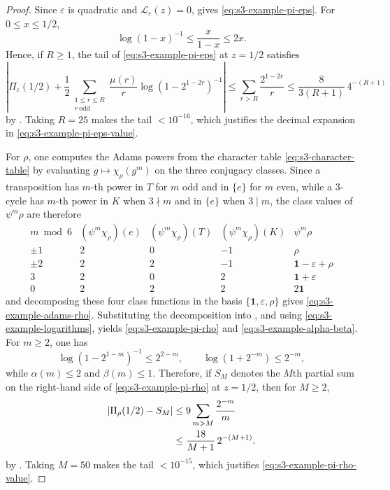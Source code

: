 \begin{proof}
  Since \(\varepsilon\) is quadratic and
  \(\mathcal L_\varepsilon(z)=0\), 
  gives \eqref{eq:s3-example-pi-eps}. For \(0\le x\le 1/2\),
  \[
    \log(1-x)^{-1}\le \frac{x}{1-x}\le 2x.
  \]
  Hence, if \(R\ge 1\), the tail of \eqref{eq:s3-example-pi-eps} at
  \(z=1/2\) satisfies
  \[
    \left|
      \Pi_\varepsilon(1/2)
      +\frac12\sum_{\substack{1\le r\le R\\ r\ \mathrm{odd}}}
        \frac{\mu(r)}{r}\log(1-2^{1-2r})^{-1}
    \right|
    \le
    \sum_{r>R}\frac{2^{1-2r}}{r}
    \le
    \frac{8}{3(R+1)}\,4^{-(R+1)}
  \]
  by . Taking \(R=25\) makes the tail
  \(<10^{-16}\), which justifies the decimal expansion in
  \eqref{eq:s3-example-pi-eps-value}.

  For \(\rho\), one computes the Adams powers from the character table
  \eqref{eq:s3-character-table} by evaluating
  \(g\mapsto \chi_\rho(g^m)\) on the three conjugacy classes. Since a
  transposition has \(m\)-th power in \(T\) for \(m\) odd and in
  \(\{e\}\) for \(m\) even, while a \(3\)-cycle has \(m\)-th power in
  \(K\) when \(3\nmid m\) and in \(\{e\}\) when \(3\mid m\), the class
  values of \(\psi^m\rho\) are therefore
  \[
    \begin{array}{c|ccc|c}
      m \bmod 6
      & (\psi^m\chi_\rho)(e)
      & (\psi^m\chi_\rho)(T)
      & (\psi^m\chi_\rho)(K)
      & \psi^m\rho \\ \hline
      \pm 1 & 2 & 0 & -1 & \rho \\
      \pm 2 & 2 & 2 & -1 & \mathbf 1-\varepsilon+\rho \\
      3 & 2 & 0 & 2 & \mathbf 1+\varepsilon \\
      0 & 2 & 2 & 2 & 2\mathbf 1
    \end{array}
  \]
  and decomposing these four class functions in the basis
  \(\{\mathbf 1,\varepsilon,\rho\}\) gives
  \eqref{eq:s3-example-adams-rho}. Substituting the decomposition into
  , and using
  \eqref{eq:s3-example-logarithms}, yields
  \eqref{eq:s3-example-pi-rho} and \eqref{eq:s3-example-alpha-beta}.
  For \(m\ge 2\), one has
  \[
    \log(1-2^{1-m})^{-1}\le 2^{2-m},
    \qquad
    \log(1+2^{-m})\le 2^{-m},
  \]
  while \(\alpha(m)\le 2\) and \(\beta(m)\le 1\). Therefore, if
  \(S_M\) denotes the \(M\)th partial sum on the right-hand side of
  \eqref{eq:s3-example-pi-rho} at \(z=1/2\), then for \(M\ge 2\),
  \[
    \begin{aligned}
      \lvert \Pi_\rho(1/2)-S_M \rvert
      &\le 9\sum_{m>M}\frac{2^{-m}}{m} \\
      &\le \frac{18}{M+1}\,2^{-(M+1)}.
    \end{aligned}
  \]
  by . Taking \(M=50\) makes the tail
  \(<10^{-15}\), which justifies
  \eqref{eq:s3-example-pi-rho-value}.
\end{proof}

